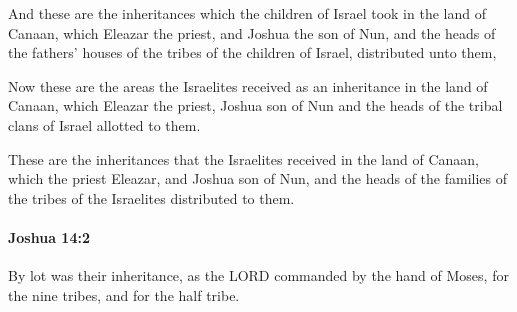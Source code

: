 			\begin{versebox}
					\item[BHS] 
					\item[ASV] And these are the inheritances which the children of Israel took in the land of Canaan, which Eleazar the priest, and Joshua the son of Nun, and the heads of the fathers' houses of the tribes of the children of Israel, distributed unto them,
					\item[NIV] Now these are the areas the Israelites received as an inheritance in the land of Canaan, which Eleazar the priest, Joshua son of Nun and the heads of the tribal clans of Israel allotted to them.
					\item[NRSV] These are the inheritances that the Israelites received in the land of Canaan, which the priest Eleazar, and Joshua son of Nun, and the heads of the families of the tribes of the Israelites distributed to them.
			\end{versebox}

		\paragraph{Joshua 14:2} %
			\label{JOSHUA-14-2}

			By lot was their inheritance, as the LORD commanded by the hand of Moses, for the nine tribes, and for the half tribe.

